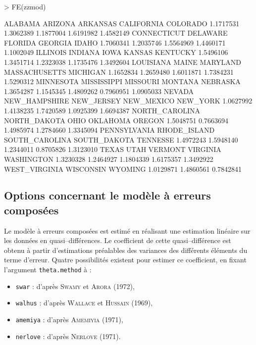 \documentclass[a4paper]{article}
\begin{document}
\begin{Schunk}
\begin{Sinput}
> FE(zzmod)
\end{Sinput}
\begin{Soutput}
       ALABAMA        ARIZONA       ARKANSAS     CALIFORNIA       COLORADO 
     1.1717531      1.3062389      1.1877004      1.6191982      1.4582149 
   CONNECTICUT       DELAWARE        FLORIDA        GEORGIA          IDAHO 
     1.7060341      1.2035746      1.5564969      1.4460171      1.1002049 
      ILLINOIS        INDIANA           IOWA         KANSAS       KENTUCKY 
     1.5496106      1.3451714      1.2323038      1.1735476      1.3492604 
     LOUISIANA          MAINE       MARYLAND  MASSACHUSETTS       MICHIGAN 
     1.1652834      1.2659480      1.6011871      1.7384231      1.5290312 
     MINNESOTA    MISSISSIPPI       MISSOURI        MONTANA       NEBRASKA 
     1.3654287      1.1545345      1.4809262      0.7960951      1.0905033 
        NEVADA  NEW_HAMPSHIRE     NEW_JERSEY     NEW_MEXICO       NEW_YORK 
     1.0627992      1.4138235      1.7420589      1.0925399      1.6694387 
NORTH_CAROLINA   NORTH_DAKOTA           OHIO       OKLAHOMA         OREGON 
     1.5048751      0.7663694      1.4985974      1.2784660      1.3345094 
  PENNSYLVANIA   RHODE_ISLAND SOUTH_CAROLINA   SOUTH_DAKOTA       TENNESSE 
     1.4972243      1.5948140      1.2344011      0.8705826      1.3123010 
         TEXAS           UTAH        VERMONT       VIRGINIA     WASHINGTON 
     1.3230328      1.2464927      1.1804339      1.6175357      1.3492922 
 WEST_VIRGINIA      WISCONSIN        WYOMING 
     1.0129871      1.4860561      0.7842841 
\end{Soutput}
\end{Schunk}

\subsection{Options concernant le modèle à erreurs composées}

Le modèle à erreurs composées est estimé en réalisant une estimation
linéaire sur les données en quasi--différences. Le coefficient de
cette quasi--différence est obtenu à partir d'estimations préalables
des variances des différents éléments du terme d'erreur. Quatre
possibilités existent pour estimer ce coefficient, en fixant
l'argument \texttt{theta.method} à :

\begin{itemize}
\item \texttt{swar} : d'après \textsc{Swamy} et \textsc{Arora} (1972),
\item \texttt{walhus} : d'après \textsc{Wallace} et \textsc{Hussain} (1969),
\item \texttt{amemiya} : d'après \textsc{Amemiyia} (1971),
\item \texttt{nerlove} : d'après \textsc{Nerlove} (1971).
\end{itemize}
\end{document}
